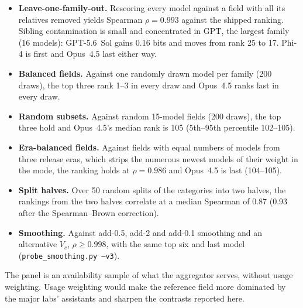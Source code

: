 \documentclass[11pt]{article}
\begin{document}
\begin{itemize}
\item \textbf{Leave-one-family-out.} Rescoring every model against a field with all its relatives removed yields Spearman $\rho = 0.993$ against the shipped ranking. Sibling contamination is small and concentrated in GPT, the largest family (16 models): GPT-5.6~Sol gains 0.16 bits and moves from rank 25 to 17. Phi-4 is first and Opus~4.5 last either way.
\item \textbf{Balanced fields.} Against one randomly drawn model per family (200 draws), the top three rank 1--3 in every draw and Opus~4.5 ranks last in every draw.
\item \textbf{Random subsets.} Against random 15-model fields (200 draws), the top three hold and Opus~4.5's median rank is 105 (5th--95th percentile 102--105).
\item \textbf{Era-balanced fields.} Against fields with equal numbers of models from three release eras, which strips the numerous newest models of their weight in the mode, the ranking holds at $\rho = 0.986$ and Opus~4.5 is last (104--105).
\item \textbf{Split halves.} Over 50 random splits of the categories into two halves, the rankings from the two halves correlate at a median Spearman of 0.87 (0.93 after the Spearman--Brown correction).
\item \textbf{Smoothing.} Against add-0.5, add-2 and add-0.1 smoothing and an alternative $V_c$, $\rho \geq 0.998$, with the same top six and last model (\texttt{probe\_smoothing.py --v3}).
\end{itemize}

The panel is an availability sample of what the aggregator serves, without usage weighting. Usage weighting would make the reference field more dominated by the major labs' assistants and sharpen the contrasts reported here.
\end{document}
